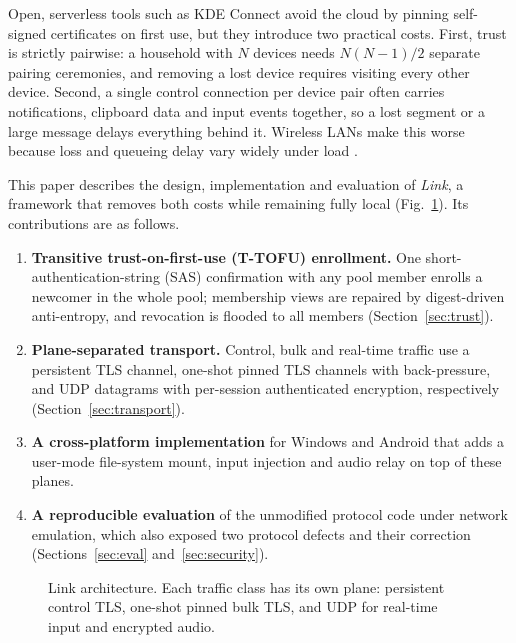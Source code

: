 \documentclass[conference,a4paper]{IEEEtran}
\begin{document}
Open, serverless tools such as KDE Connect \cite{kdeconnect} avoid the cloud by pinning self-signed certificates on first use, but they introduce two practical costs. First, trust is strictly pairwise: a household with $N$ devices needs $N(N-1)/2$ separate pairing ceremonies, and removing a lost device requires visiting every other device. Second, a single control connection per device pair often carries notifications, clipboard data and input events together, so a lost segment or a large message delays everything behind it. Wireless LANs make this worse because loss and queueing delay vary widely under load \cite{liu2023wifi6, carrascosa2024mlo}.

This paper describes the design, implementation and evaluation of \emph{Link}, a framework that removes both costs while remaining fully local (Fig.~\ref{fig:arch}). Its contributions are as follows.
\begin{enumerate}
\item \textbf{Transitive trust-on-first-use (T-TOFU) enrollment.} One short-authentication-string (SAS) confirmation with any pool member enrolls a newcomer in the whole pool; membership views are repaired by digest-driven anti-entropy, and revocation is flooded to all members (Section~\ref{sec:trust}).
\item \textbf{Plane-separated transport.} Control, bulk and real-time traffic use a persistent TLS channel, one-shot pinned TLS channels with back-pressure, and UDP datagrams with per-session authenticated encryption, respectively (Section~\ref{sec:transport}).
\item \textbf{A cross-platform implementation} for Windows and Android that adds a user-mode file-system mount, input injection and audio relay on top of these planes.
\item \textbf{A reproducible evaluation} of the unmodified protocol code under network emulation, which also exposed two protocol defects and their correction (Sections~\ref{sec:eval} and~\ref{sec:security}).
\end{enumerate}

\begin{figure}[t]
\centering

\caption{Link architecture. Each traffic class has its own plane: persistent control TLS, one-shot pinned bulk TLS, and UDP for real-time input and encrypted audio.}
\label{fig:arch}
\end{figure}
\end{document}
